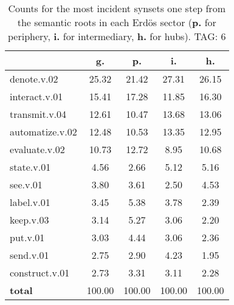 \begin{table}[h!]
\begin{center}
\begin{tabular}{| l | c | c | c | c |}\hline
 & g. & p. & i. & h. \\\hline
denote.v.02 & 25.32  & 21.42  & 27.31  & 26.15 \\\hline
interact.v.01 & 15.41  & 17.28  & 11.85  & 16.30 \\\hline
transmit.v.04 & 12.61  & 10.47  & 13.68  & 13.06 \\\hline
automatize.v.02 & 12.48  & 10.53  & 13.35  & 12.95 \\\hline
evaluate.v.02 & 10.73  & 12.72  & 8.95  & 10.68 \\\hline
state.v.01 & 4.56  & 2.66  & 5.12  & 5.16 \\\hline
see.v.01 & 3.80  & 3.61  & 2.50  & 4.53 \\\hline
label.v.01 & 3.45  & 5.38  & 3.78  & 2.39 \\\hline
keep.v.03 & 3.14  & 5.27  & 3.06  & 2.20 \\\hline
put.v.01 & 3.03  & 4.44  & 3.06  & 2.36 \\\hline
send.v.01 & 2.75  & 2.90  & 4.23  & 1.95 \\\hline
construct.v.01 & 2.73  & 3.31  & 3.11  & 2.28 \\\hline
{{\bf total}} & 100.00  & 100.00  & 100.00  & 100.00 \\\hline
\end{tabular}
\caption{Counts for the most incident synsets one step from the semantic roots in each Erd\"os sector ({\bf p.} for periphery, {\bf i.} for intermediary, {\bf h.} for hubs). TAG: 6}
\end{center}
\end{table}
